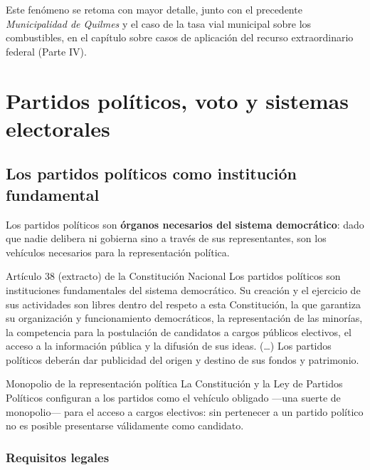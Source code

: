 \documentclass[12pt,oneside]{book}
\begin{document}
Este fenómeno se retoma con mayor detalle, junto con el precedente \emph{Municipalidad de Quilmes} y el caso de la tasa vial municipal sobre los combustibles, en el capítulo sobre casos de aplicación del recurso extraordinario federal (Parte IV).

\chapter[Partidos y sistemas electorales]{Partidos políticos, voto y sistemas electorales}

\section{Los partidos políticos como institución fundamental}

Los partidos políticos son \textbf{órganos necesarios del sistema democrático}: dado que nadie delibera ni gobierna sino a través de sus representantes, son los vehículos necesarios para la representación política.

\begin{norma}{Artículo 38 (extracto) de la Constitución Nacional}
Los partidos políticos son instituciones fundamentales del sistema democrático. Su creación y el ejercicio de sus actividades son libres dentro del respeto a esta Constitución, la que garantiza su organización y funcionamiento democráticos, la representación de las minorías, la competencia para la postulación de candidatos a cargos públicos electivos, el acceso a la información pública y la difusión de sus ideas. (\ldots) Los partidos políticos deberán dar publicidad del origen y destino de sus fondos y patrimonio.
\end{norma}

\begin{definition}{Monopolio de la representación política}
La Constitución y la Ley de Partidos Políticos configuran a los partidos como el vehículo obligado ---una suerte de monopolio--- para el acceso a cargos electivos: sin pertenecer a un partido político no es posible presentarse válidamente como candidato.
\end{definition}

\subsection{Requisitos legales}
\end{document}
